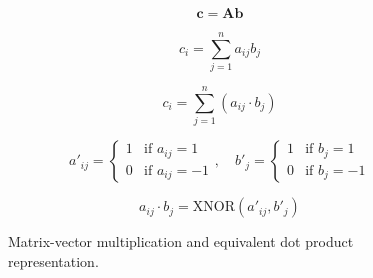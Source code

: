 \documentclass[conference,a4paper,flushend]{cs-techrep}
\begin{document}
\begin{figure}[h]
    \centering
    \begin{equation}
    \mathbf{c} = \mathbf{A} \mathbf{b}
    \label{eq:matrix_vector_multiplication}
    \end{equation}

    \begin{equation}
    c_i = \sum_{j=1}^n a_{ij} b_j
    \label{eq:dot_product}
    \end{equation}

    \begin{equation}
    c_i = \sum_{j=1}^n (a_{ij} \cdot b_j)
    \label{eq:component_wise_dot}
    \end{equation}

    \begin{equation}
    a'_{ij} = \begin{cases}
    1 & \text{if } a_{ij} = 1 \\
    0 & \text{if } a_{ij} = -1
    \end{cases}, \quad
    b'_j = \begin{cases}
    1 & \text{if } b_j = 1 \\
    0 & \text{if } b_j = -1
    \end{cases}
    \label{eq:mapping}
    \end{equation}

    \begin{equation}
    a_{ij} \cdot b_j = \text{XNOR}(a'_{ij}, b'_j)
    \label{eq:xnor}
    \end{equation}

    \caption{Matrix-vector multiplication and equivalent dot product representation.}
    \label{fig:matrix_vector_multiplication}
\end{figure}
\end{document}
